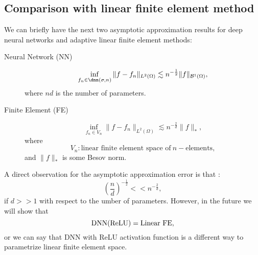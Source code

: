 \subsection{Comparison with linear finite element method}
We can briefly have the next two asymptotic approximation results for deep neural networks and adaptive
linear finite element methods:
\begin{description}
	\item[Neural Network (NN)] 
	\begin{equation}\label{key}
	\inf_{f_n \in \dnn(\sigma,n)} \|f-f_n\|_{L^{2}(\Omega)} \lesssim  n^{-\frac{1}{2}}\|f\|_{\mathcal B^1(\Omega)},
	\end{equation}
	where $nd$ is the number of parameters.
	\item[Finite Element (FE)] 
	\begin{equation}\label{key}
	\inf_{f_n \in V_n} \|f-f_n\|_{L^{2}(\Omega)} \lesssim  n^{-\frac{2}{d}}\|f\|_{\ast},
	\end{equation}
	where
	\begin{equation}\label{key}
	V_n: \text{linear finite element space of}~ n-\text{elements},
	\end{equation}
	and $\|f\|_{\ast}$ is some Besov norm. 
\end{description}
A direct observation for the asymptotic approximation error is that :
\begin{equation}\label{key}
(\frac{n}{d})^{-\frac{1}{2}} << n^{-\frac{2}{d}},
\end{equation}
if $d >> 1$ with respect to the umber of parameters. However, in the future  we will show that 
\begin{equation}\label{key}
{\rm DNN}({\rm ReLU}) = \text{Linear FE},
\end{equation}
or we can say that DNN with ReLU activation function is a different way to parametrize linear 
finite element space.
\fi
